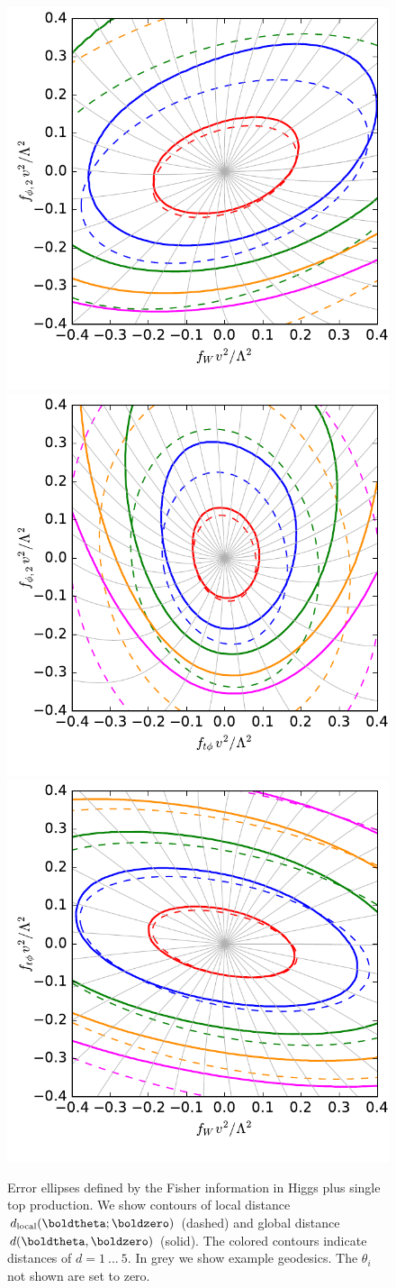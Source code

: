 \begin{figure}[b]
  \includegraphics[height=0.34 \textwidth,clip,trim=0.3cm 0 0.05cm 0]{fig/information/th_geometry_fphi2_fw}%
  \includegraphics[height=0.34 \textwidth,clip,trim=0.3cm 0 0.05cm 0]{fig/information/th_geometry_fphi2_ftphi}%
  \includegraphics[height=0.34 \textwidth,clip,trim=0.3cm 0 0.05cm 0]{fig/information/th_geometry_ftphi_fw}%
  \caption{Error ellipses defined by the Fisher information in Higgs
    plus single top production. We show contours of local distance
    $d_\text{local}(\boldtheta ; \boldzero)$ (dashed) and global distance
    $d(\boldtheta,\boldzero)$ (solid).  The colored contours indicate
    distances of $d = 1~...~5$. In grey we show example geodesics. The
    $\theta_i$ not shown are set to zero. }
\label{fig:information_th_geometry}
\end{figure}

